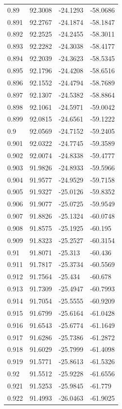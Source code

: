 \begin{tabular}{llll}
0.89 & 92.3008 & -24.1293 & -58.0686 \\
0.891 & 92.2767 & -24.1874 & -58.1847 \\
0.892 & 92.2525 & -24.2455 & -58.3011 \\
0.893 & 92.2282 & -24.3038 & -58.4177 \\
0.894 & 92.2039 & -24.3623 & -58.5345 \\
0.895 & 92.1796 & -24.4208 & -58.6516 \\
0.896 & 92.1552 & -24.4794 & -58.7689 \\
0.897 & 92.1307 & -24.5382 & -58.8864 \\
0.898 & 92.1061 & -24.5971 & -59.0042 \\
0.899 & 92.0815 & -24.6561 & -59.1222 \\
0.9 & 92.0569 & -24.7152 & -59.2405 \\
0.901 & 92.0322 & -24.7745 & -59.3589 \\
0.902 & 92.0074 & -24.8338 & -59.4777 \\
0.903 & 91.9826 & -24.8933 & -59.5966 \\
0.904 & 91.9577 & -24.9529 & -59.7158 \\
0.905 & 91.9327 & -25.0126 & -59.8352 \\
0.906 & 91.9077 & -25.0725 & -59.9549 \\
0.907 & 91.8826 & -25.1324 & -60.0748 \\
0.908 & 91.8575 & -25.1925 & -60.195 \\
0.909 & 91.8323 & -25.2527 & -60.3154 \\
0.91 & 91.8071 & -25.313 & -60.436 \\
0.911 & 91.7817 & -25.3734 & -60.5569 \\
0.912 & 91.7564 & -25.434 & -60.678 \\
0.913 & 91.7309 & -25.4947 & -60.7993 \\
0.914 & 91.7054 & -25.5555 & -60.9209 \\
0.915 & 91.6799 & -25.6164 & -61.0428 \\
0.916 & 91.6543 & -25.6774 & -61.1649 \\
0.917 & 91.6286 & -25.7386 & -61.2872 \\
0.918 & 91.6029 & -25.7999 & -61.4098 \\
0.919 & 91.5771 & -25.8613 & -61.5326 \\
0.92 & 91.5512 & -25.9228 & -61.6556 \\
0.921 & 91.5253 & -25.9845 & -61.779 \\
0.922 & 91.4993 & -26.0463 & -61.9025 \\

\end{tabular}

